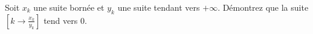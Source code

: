 
\begin{exercice}\label{exo0011}

Soit $x_k$ une suite bornée et $y_k$ une suite tendant vers $+ \infty $. Démontrez que la suite $[k \rightarrow \frac{x_k}{y_k}]$ tend vers 0.

\end{exercice}
